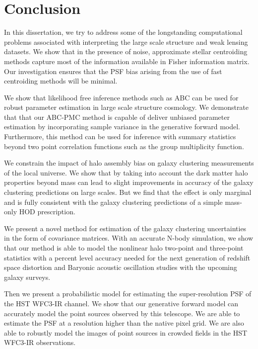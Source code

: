 \chapter*{Conclusion}

In this dissertation, we try to address some of the longstanding computational problems associated with 
interpreting the large scale structure and weak lensing datasets.
We show that in the presence of noise, approximate stellar centroiding methods capture most of the 
information available in Fisher information matrix. Our investigation ensures that the PSF bias arising 
from the use of fast centroiding methods will be minimal. 

We show that likelihood free inference methods such as ABC can be used for robust parameter estimation 
in large scale structure cosmology. We demonstrate that that our ABC-PMC method is capable of deliver unbiased 
parameter estimation by incorporating sample variance in the generative forward model. Furthermore, this method can be used 
for inference with summary statistics beyond two point correlation functions such as the group multiplicity function.

We constrain the impact of halo assembly bias on galaxy clustering measurements of the local universe. 
We show that by taking into account the dark matter halo properties beyond mass can lead to slight improvements in 
accuracy of the galaxy clustering predictions on large scales. But we find that the effect is only marginal and is fully consistent 
with the galaxy clustering predictions of a simple mass-only HOD prescription.

We present a novel method for estimation of the galaxy clustering uncertainties in the form of covariance matrices. 
With an accurate N-body simulation, we show that our method is able to model the nonlinear halo two-point and three-point statistics with a 
percent level accuracy needed for the next generation of redshift space distortion and Baryonic acoustic oscillation 
studies with the upcoming galaxy surveys.

Then we present a probabilistic model for estimating the super-resolution PSF of the HST WFC3-IR channel.
We show that our generative forward model can accurately model the point sources observed by this telescope. We are able 
to estimate the PSF at a resolution higher than the native pixel grid. We are also able to robustly model the images of 
point sources in crowded fields in the HST WFC3-IR observations.










